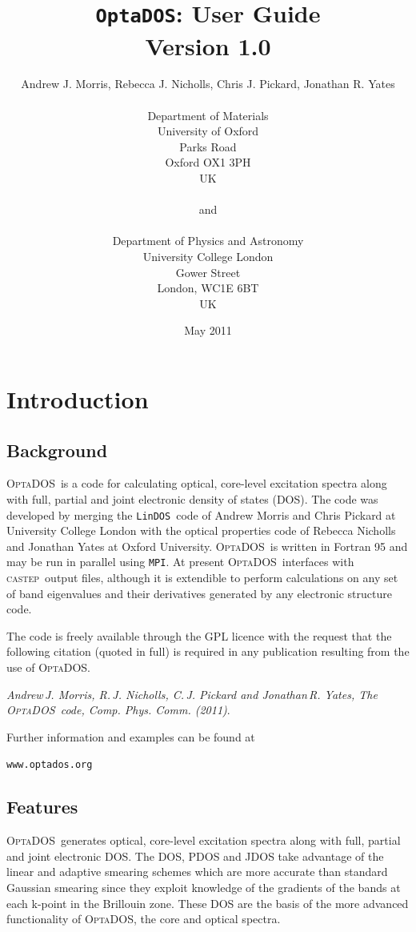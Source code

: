 \documentclass[a4paper,11pt,twoside]{book}
\title{{\huge {\tt OptaDOS}: User Guide}\\ {Version 1.0}}
\author{Andrew J. Morris, Rebecca J. Nicholls, Chris J. Pickard, Jonathan R. Yates \\
\\
Department of Materials\\
University of Oxford\\
Parks Road\\
Oxford OX1 3PH\\
UK \\
\\
{\small and} \\
\\
Department of Physics and Astronomy\\
University College London\\
Gower Street\\
London, WC1E 6BT\\
UK}
\date{May 2011}
\begin{document}
\newcommand{\optados}{\textsc{OptaDOS}}
\newcommand{\lindos}{\texttt{LinDOS}}
\newcommand{\castep}{\textsc{castep}}
\maketitle

\setcounter{tocdepth}{1}
\tableofcontents

\chapter{Introduction}\label{chap:introduction}
\section{Background}
\optados\ is a code for calculating optical, core-level excitation spectra along with full, partial and joint electronic density of states (DOS).  The code was developed by merging the \lindos\ code of Andrew Morris and Chris Pickard at University College London with the optical properties code of Rebecca Nicholls and Jonathan Yates at Oxford University.  \optados\ is written in Fortran 95 and may be run in parallel using {\tt MPI}.  At present \optados\ interfaces with \castep\ output files, although it is extendible to perform calculations on any set of band eigenvalues and their derivatives generated by any electronic structure code.

The code is freely available through the GPL licence with the request that the following citation (quoted in full) is required in any publication resulting from the use of \optados.

\emph{Andrew\,J. Morris, R.\,J. Nicholls, C.\,J. Pickard and Jonathan\,R. Yates, The \optados\ code, Comp. Phys. Comm. (2011)}.

\begin{center}
Further information and examples can be found at

\verb#www.optados.org#
\end{center}


\section{Features}
\optados\ generates optical, core-level excitation spectra along with full, partial and joint electronic DOS. The DOS, PDOS and JDOS take advantage of the linear and adaptive smearing schemes which are more accurate than standard Gaussian smearing since they exploit knowledge of the gradients of the bands at each k-point in the Brillouin zone.  These DOS are the basis of the more advanced functionality of \optados, the core and optical spectra.
\end{document}
